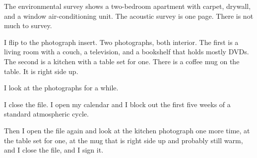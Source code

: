 The environmental survey shows a two-bedroom apartment with carpet, drywall, and a window air-conditioning unit. The acoustic survey is one page. There is not much to survey.

I flip to the photograph insert. Two photographs, both interior. The first is a living room with a couch, a television, and a bookshelf that holds mostly DVDs. The second is a kitchen with a table set for one. There is a coffee mug on the table. It is right side up.

I look at the photographs for a while.

I close the file. I open my calendar and I block out the first five weeks of a standard atmospheric cycle.

Then I open the file again and look at the kitchen photograph one more time, at the table set for one, at the mug that is right side up and probably still warm, and I close the file, and I sign it.
